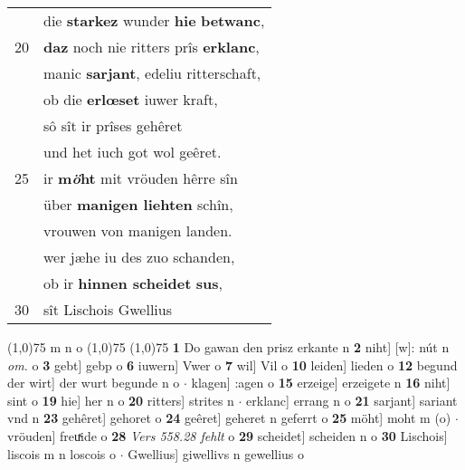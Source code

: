 \documentclass[8pt,a4paper,notitlepage]{article}
\begin{document}
\begin{table}[ht]
\begin{minipage}[t]{0.5\linewidth}
\begin{tabular}{rl}
 & die \textbf{starkez} wunder \textbf{hie} \textbf{betwanc},\\ 
20 & \textbf{daz} noch nie ritters prîs \textbf{erklanc},\\ 
 & manic \textbf{sarjant}, edeliu ritterschaft,\\ 
 & ob die \textbf{erlœset} iuwer kraft,\\ 
 & sô sît ir prîses gehêret\\ 
 & und het iuch got wol geêret.\\ 
25 & ir \textbf{m\textit{ö}ht} mit vröuden hêrre sîn\\ 
 & über \textbf{manigen liehten} schîn,\\ 
 & vrouwen von manigen landen.\\ 
 & wer jæhe iu des zuo schanden,\\ 
 & ob ir \textbf{hinnen scheidet} \textbf{sus},\\ 
30 & sît Lischois Gwellius\\ 
\end{tabular}
\scriptsize
\line(1,0){75} \newline
m n o \newline
\line(1,0){75} \newline
\newline
\line(1,0){75} \newline
\textbf{1} Do gawan den prisz erkante n \textbf{2} niht] [w]: nút n \textit{om.} o \textbf{3} gebt] gebp o \textbf{6} iuwern] Vwer o \textbf{7} wil] Vil o \textbf{10} leiden] lieden o \textbf{12} begund der wirt] der wurt begunde n o  $\cdot$ klagen] :agen o \textbf{15} erzeige] erzeigete n \textbf{16} niht] sint o \textbf{19} hie] her n o \textbf{20} ritters] strites n  $\cdot$ erklanc] errang n o \textbf{21} sarjant] sariant vnd n \textbf{23} gehêret] gehoret o \textbf{24} geêret] geheret n geferrt o \textbf{25} möht] moht m (o)  $\cdot$ vröuden] freuͯide o \textbf{28} \textit{Vers 558.28 fehlt} o  \textbf{29} scheidet] scheiden n o \textbf{30} Lischois] liscois m n loscois o  $\cdot$ Gwellius] giwellivs n gewellius o \newline
\end{minipage}
\end{table}
\newpage
\end{document}
